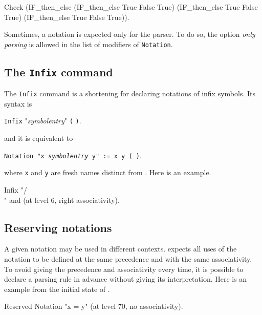 \begin{coq_example}
Check 
 (IF_then_else (IF_then_else True False True) 
   (IF_then_else True False True)
   (IF_then_else True False True)).   
\end{coq_example}

\Rem
Sometimes, a notation is expected only for the parser.
To do so, the option {\em only parsing} is allowed in the list of modifiers of
\texttt{Notation}.

\subsection{The \texttt{Infix} command}

The \texttt{Infix} command is a shortening for declaring notations of
infix symbols. Its syntax is 

\medskip

\noindent\texttt{Infix} "{\em symbolentry}" {\qualid} {\tt (}  {\tt )}.

\medskip

and it is equivalent to

\medskip

\noindent\texttt{Notation "x {\em symbolentry} y" := {\qualid} x y  (  )}.

\medskip

where {\tt x} and {\tt y} are fresh names distinct from {\qualid}. Here is an example.

\begin{coq_example*}
Infix "/\\" and (at level 6, right associativity).
\end{coq_example*}

\subsection{Reserving notations}

A given notation may be used in different contexts. {\Coq} expects all
uses of the notation to be defined at the same precedence and with the
same associativity. To avoid giving the precedence and associativity
every time, it is possible to declare a parsing rule in advance
without giving its interpretation. Here is an example from the initial
state of {\Coq}.

\begin{coq_example}
Reserved Notation "x = y" (at level 70, no associativity).
\end{coq_example}

